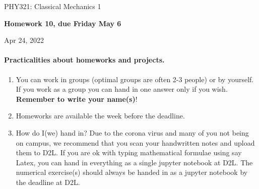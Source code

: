 \documentclass[%
oneside,                 %
final,                   %
10pt]{article}
\begin{document}

\newcommand{\exercisesection}[1]{\subsection*{#1}}






\thispagestyle{empty}

\begin{center}
{\LARGE\bf
\begin{spacing}{1.25}
PHY321: Classical Mechanics 1
\end{spacing}
}
\end{center}


\begin{center}
{\bf Homework 10, due Friday  May 6${}^{}$} \\ [0mm]
\end{center}

\begin{center}
\end{center}
    

\begin{center}
Apr 24, 2022
\end{center}

\vspace{1cm}


\paragraph{Practicalities about  homeworks and projects.}
\begin{enumerate}
\item You can work in groups (optimal groups are often 2-3 people) or by yourself. If you work as a group you can hand in one answer only if you wish. \textbf{Remember to write your name(s)}!

\item Homeworks are available  the week before the deadline. 

\item How do I(we)  hand in?  Due to the corona virus and many of you not being on campus, we recommend that you scan your handwritten notes and upload them to D2L. If you are ok with typing mathematical formulae using say Latex, you can hand in everything as a single jupyter notebook at D2L. The numerical exercise(s) should always be handed in as a jupyter notebook by the deadline at D2L. 
\end{enumerate}
\end{document}
